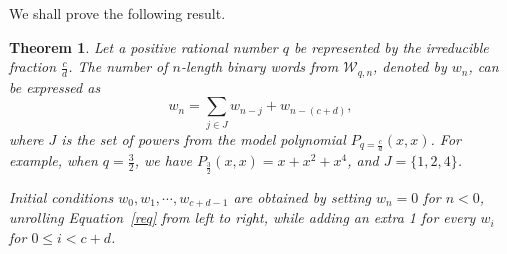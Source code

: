 \documentclass[a4paper,12pt]{article}
\newtheorem{theorem}{Theorem}
\theoremstyle{definition}
\newcommand{\W}{\mathcal{W}}
\let\le\leqslant
\begin{document}
We shall prove the following result.

\begin{theorem}
  Let a positive rational number $q$ be represented by the irreducible
  fraction $\frac{c}{d}$.  The number of $n$-length binary words from
  $\W_{q,n}$, denoted by $w_n$, can be expressed as
  \begin{equation}
    w_n = \sum_{j\in J} w_{n-j} + w_{n-(c+d)},
    \label{req}
  \end{equation}
  where $J$ is the set
  of powers from the model polynomial $P_{q=\frac{c}{d}}(x,x)$. For
  example, when $q=\frac{3}{2}$, we have $P_{\frac{3}{2}}(x,x) = x +
  x^2 + x^4$, and $J = \{1,2,4\}$.
  
  Initial conditions $w_0, w_1, \cdots, w_{c+d-1}$ are obtained by setting $w_n = 0$ for $n < 0$,
  unrolling Equation~\eqref{req} from left to right, while adding an extra 1 for every
  $w_i$ for $0 \le i < c+d$.
  \label{rec}
\end{theorem}
\end{document}
